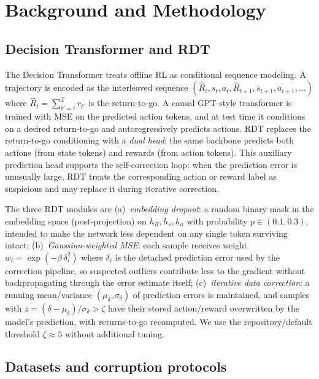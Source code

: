 \documentclass[10pt,twocolumn,letterpaper]{article}
\begin{document}
\section{Background and Methodology}
\label{sec:bg}

\subsection{Decision Transformer and RDT}

The Decision Transformer treats offline RL as conditional sequence
modeling. A trajectory is encoded as the interleaved sequence
$(\hat R_t, s_t, a_t, \hat R_{t+1}, s_{t+1}, a_{t+1}, \dots)$ where
$\hat R_t = \sum_{t'=t}^{T} r_{t'}$ is the return-to-go. A causal
GPT-style transformer is trained with MSE on the predicted action tokens,
and at test time it conditions on a desired return-to-go and
autoregressively predicts actions. RDT replaces the return-to-go
conditioning with a \emph{dual head}: the same backbone predicts both
actions (from state tokens) and rewards (from action tokens). This auxiliary
prediction head supports the self-correction loop: when the prediction error
is unusually large, RDT treats the corresponding action or reward label as
suspicious and may replace it during iterative correction.

The three RDT modules are (a)~\emph{embedding dropout}: a random binary
mask in the embedding space (post-projection) on $h_R, h_s, h_a$ with
probability $p\in(0.1, 0.3)$, intended to make the network less
dependent on any single token surviving intact;
(b)~\emph{Gaussian-weighted MSE}: each sample receives weight
$w_i = \exp(-\beta\,\delta_i^2)$ where $\delta_i$ is the detached prediction
error used by the correction pipeline, so suspected outliers contribute less
to the gradient without backpropagating through the error estimate itself;
(c)~\emph{iterative data correction}: a running mean/variance
$(\mu_\delta, \sigma_\delta)$ of prediction errors is maintained, and
samples with $z = (\delta-\mu_\delta)/\sigma_\delta > \zeta$ have their
stored action/reward overwritten by the model's prediction, with
returns-to-go recomputed. We use the repository/default threshold
$\zeta\approx 5$ without additional tuning.

\subsection{Datasets and corruption protocols}
\end{document}
